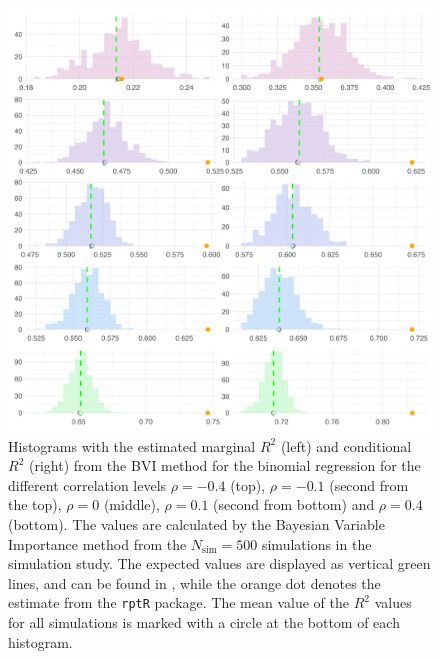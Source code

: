 \begin{figure}[H]
  \centering
  \includegraphics[width=1.1\linewidth]{Figures/Simulation study/R2_combined_poisson.png}
  \caption[Marginal and conditional $R^2$ in Poisson GLMM]{Histograms with the estimated marginal $R^2$ (left) and conditional $R^2$ (right) from the BVI method for the binomial regression for the different correlation levels $\rho=-0.4$ (top), $\rho=-0.1$ (second from the top), $\rho=0$ (middle), $\rho=0.1$ (second from bottom) and $\rho=0.4$ (bottom). The values are calculated by the Bayesian Variable Importance method from the $N_{\text{sim}}=500$ simulations in the simulation study. The expected values are displayed as vertical green lines, and can be found in , while the orange dot denotes the estimate from the \texttt{rptR} package. The mean value of the $R^2$ values for all simulations is marked with a circle at the bottom of each histogram.}
  \label{fig:r2_combined_poisson}
\end{figure}




